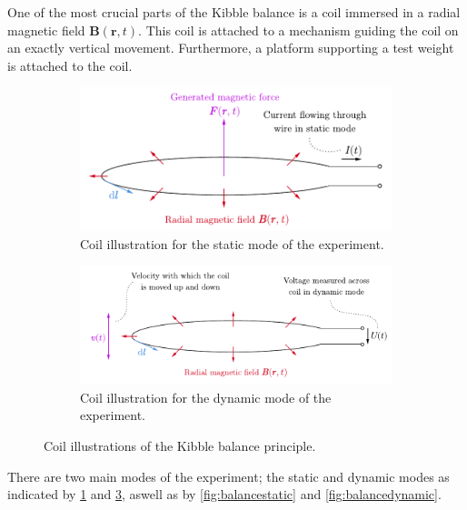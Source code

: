 \documentclass{report}
\numberwithin{tm}{section}
\newcommand\vect[1]{\ensuremath{\bm{#1}}}
\begin{document}
	One of the most crucial parts of the Kibble balance is a coil immersed in a radial magnetic field $\vect{B}(\vect{r},t)$. This coil is attached to a mechanism guiding the coil on an exactly vertical movement. Furthermore, a platform supporting a test weight is attached to the coil.
	\begin{figure}[h]
		\centering
		\begin{subfigure}{0.49\textwidth}
			\centering
			\includegraphics[width=\textwidth]{figures/coilstatic.pdf}
			\caption{Coil illustration for the static mode of the experiment.}
			\label{fig:coilstatic}
		\end{subfigure}
		\hfill
		\begin{subfigure}{0.49\textwidth}
			\centering
			\includegraphics[width=\textwidth]{figures/coildynamic.pdf}
			\caption{Coil illustration for the dynamic mode of the experiment.}
			\label{fig:coildynamic}
	\end{subfigure}
	\caption{Coil illustrations of the Kibble balance principle.}
	\end{figure}
	
	There are two main modes of the experiment; the static and dynamic modes as indicated by \cref{fig:coilstatic} and \cref{fig:coildynamic}, aswell as by \cref{fig:balancestatic} and \cref{fig:balancedynamic}.
	
\end{document}
